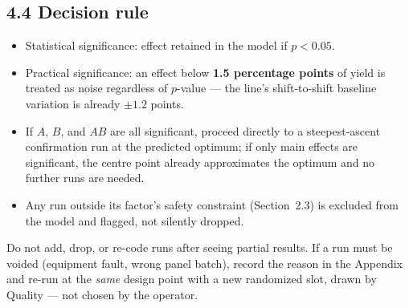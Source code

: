 \subsection*{4.4 Decision rule}
\begin{itemize}
  \item Statistical significance: effect retained in the model if \(p < 0.05\).
  \item Practical significance: an effect below \textbf{1.5 percentage points} of yield is
        treated as noise regardless of \(p\)-value --- the line's shift-to-shift baseline
        variation is already \(\pm1.2\) points.
  \item If \(A\), \(B\), and \(AB\) are all significant, proceed directly to a steepest-ascent
        confirmation run at the predicted optimum; if only main effects are significant, the
        centre point already approximates the optimum and no further runs are needed.
  \item Any run outside its factor's safety constraint (Section~2.3) is excluded from the model
        and flagged, not silently dropped.
\end{itemize}

\begin{warnbox}
Do not add, drop, or re-code runs after seeing partial results. If a run must be voided
(equipment fault, wrong panel batch), record the reason in the Appendix and re-run at the
\emph{same} design point with a new randomized slot, drawn by Quality --- not chosen by the
operator.
\end{warnbox}
